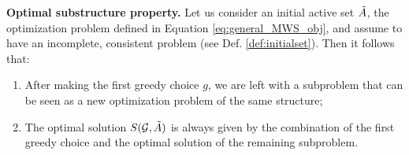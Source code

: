 \begin{lemma}\label{theo:optm_sub_prop}
\textbf{Optimal substructure property.}
Let us consider an initial active set $\tilde{A}$, the optimization problem defined in Equation \ref{eq:general_MWS_obj}, and assume to have an incomplete, consistent problem (see Def. \ref{def:initialset}). Then it follows that:
\begin{enumerate}
\item After making the first greedy choice $g$, we are left with a subproblem that can be seen as a new optimization problem of the same structure;
\item The optimal solution $S(\mathcal{G},\tilde{A})$ is always given by the combination of the first greedy choice and the optimal solution of the remaining subproblem.
\end{enumerate}
 
\end{lemma}

